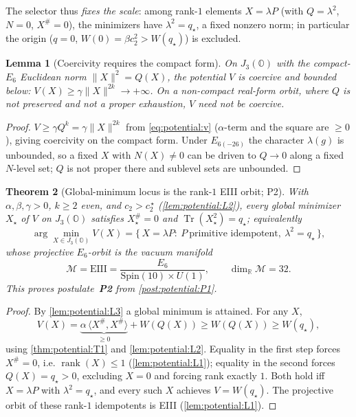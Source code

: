\documentclass[11pt]{article}
\theoremstyle{plain}
\newtheorem{theorem}{Theorem}[section]
\newtheorem{lemma}[theorem]{Lemma}
\theoremstyle{definition}
\theoremstyle{remark}
\begin{document}
The selector thus \emph{fixes the scale}: among rank-$1$ elements $X=\lambda P$ (with
$Q=\lambda^2$, $N=0$, $X^\#=0$), the minimizers have $\lambda^2=q_\star$, a fixed nonzero
norm; in particular the origin ($q=0$, $W(0)=\beta c_2^2>W(q_\star)$) is excluded.

\begin{lemma}[Coercivity requires the compact form]
\label{lem:potential:L3}
On $J_3(\mathbb O)$ with the compact-$E_6$ Euclidean norm $\|X\|^2=Q(X)$, the potential $V$ is
coercive and bounded below: $V(X)\ge\gamma\|X\|^{2k}\to+\infty$. On a non-compact real-form
orbit, where $Q$ is not preserved and not a proper exhaustion, $V$ need not be coercive.
\end{lemma}

\begin{proof}
$V\ge\gamma Q^k=\gamma\|X\|^{2k}$ from \eqref{eq:potential:v} ($\alpha$-term and the square
are $\ge0$), giving coercivity on the compact form. Under $E_{6(-26)}$ the character
$\lambda(g)$ is unbounded, so a fixed $X$ with $N(X)\neq0$ can be driven to $Q\to0$ along a
fixed $N$-level set; $Q$ is not proper there and sublevel sets are unbounded.
\end{proof}

\begin{theorem}[Global-minimum locus is the rank-$1$ EIII orbit; P2]
\label{thm:potential:T4}
\label{thm:vacuum:T4}
\label{thm:potential:vacuum}
\label{thm:ExplicitBreaking}
With $\alpha,\beta,\gamma>0$, $k\ge2$ even, and $c_2>c_2^{\,\star}$
(\autoref{lem:potential:L2}), every global minimizer $X_\star$ of $V$ on $J_3(\mathbb O)$
satisfies $X_\star^\#=0$ and $\operatorname{Tr}(X_\star^2)=q_\star$; equivalently
\begin{equation}
\label{eq:potential:argmin}
\arg\min_{X\in J_3(\mathbb O)}V(X)
=\{\,X=\lambda P:\ P\ \text{primitive idempotent},\ \lambda^2=q_\star\,\},
\end{equation}
whose projective $E_6$-orbit is the vacuum manifold
\begin{equation}
\label{eq:potential:vacuum}
\mathcal M=\mathrm{EIII}=\frac{E_6}{\mathrm{Spin}(10)\times U(1)},
\qquad \dim_{\mathbb R}\mathcal M=32.
\end{equation}
This proves postulate~\textbf{P2} from \autoref{post:potential:P1}.
\end{theorem}

\begin{proof}
By \autoref{lem:potential:L3} a global minimum is attained. For any $X$,
\begin{equation*}
V(X)=\underbrace{\alpha\,\langle X^\#,X^\#\rangle}_{\ge0}+W(Q(X))\ge W(Q(X))\ge W(q_\star),
\end{equation*}
using \autoref{thm:potential:T1} and \autoref{lem:potential:L2}. Equality in the first step
forces $X^\#=0$, i.e. $\operatorname{rank}(X)\le1$ (\autoref{lem:potential:L1}); equality in
the second forces $Q(X)=q_\star>0$, excluding $X=0$ and forcing rank exactly $1$. Both hold
iff $X=\lambda P$ with $\lambda^2=q_\star$, and every such $X$ achieves $V=W(q_\star)$. The
projective orbit of these rank-$1$ idempotents is EIII (\autoref{lem:potential:L1}).
\end{proof}
\end{document}
